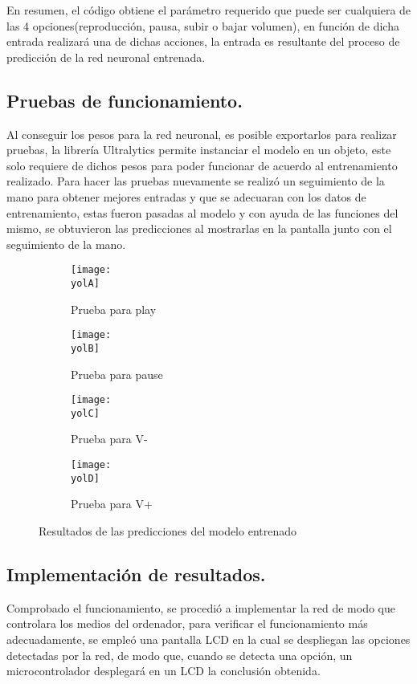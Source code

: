 \documentclass[a4paper, 12pt]{article}
\newcommand{\yolA}{img/test_yolo.png}
\newcommand{\yolB}{img/test_yolo1.png}
\newcommand{\yolC}{img/test_yolo2.png}
\newcommand{\yolD}{img/yolo_test3.png}
\newcommand{\code}{code/audio.py}
\begin{document}
	
	En resumen, el código obtiene el parámetro requerido que puede ser cualquiera de las 4 opciones(reproducción, pausa, subir o bajar volumen), en función de dicha entrada realizará una de dichas acciones, la entrada es resultante del proceso de predicción de la red neuronal entrenada.

	\subsection{Pruebas de funcionamiento.}
	Al conseguir los pesos para la red neuronal, es posible exportarlos para realizar pruebas, la librería Ultralytics permite instanciar el modelo en un objeto, este solo requiere de dichos pesos para poder funcionar de acuerdo al entrenamiento realizado. Para hacer las pruebas nuevamente se realizó un seguimiento de la mano para obtener mejores entradas y que se adecuaran con los datos de entrenamiento, estas fueron pasadas al modelo y con ayuda de las funciones del mismo, se obtuvieron las predicciones al mostrarlas en la pantalla junto con el seguimiento de la mano.

	\begin{figure}[H]
        \centering

		\begin{subfigure}{0.38\linewidth}
			\texttt{[image: \\yolA]}
			\caption{Prueba para play}
			\label{sub:play}
		\end{subfigure}

		\begin{subfigure}{0.37\linewidth}
			\texttt{[image: \\yolB]}
			\caption{Prueba para pause}
			\label{sub:pause}
		\end{subfigure}

		\begin{subfigure}{0.38\linewidth}
			\texttt{[image: \\yolC]}
			\caption{Prueba para V-}
			\label{sub:v+}
		\end{subfigure}

		\begin{subfigure}{0.37\linewidth}
			\texttt{[image: \\yolD]}
			\caption{Prueba para V+}
			\label{sub:v-}
		\end{subfigure}

		\caption{Resultados de las predicciones del modelo entrenado}
	\end{figure}

	\subsection{Implementación de resultados.}
	Comprobado el funcionamiento, se procedió a implementar la red de modo que controlara los medios del ordenador, para verificar el funcionamiento más adecuadamente, se empleó una pantalla LCD en la cual se despliegan las opciones detectadas por la red, de modo que, cuando se detecta una opción, un microcontrolador desplegará en un LCD la conclusión obtenida.
\end{document}
